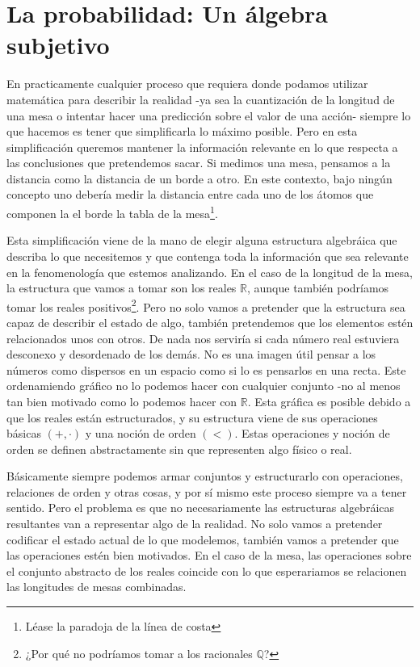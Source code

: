 
\chapter{La probabilidad: Un \'algebra subjetivo}
En practicamente cualquier proceso que requiera donde podamos utilizar matemática para describir la realidad -ya sea la cuantización de la longitud de una mesa o intentar hacer una predicción sobre el valor de una acción- siempre lo que hacemos es tener que simplificarla lo máximo posible. Pero en esta simplificación queremos mantener la información relevante en lo que respecta a las conclusiones que pretendemos sacar. Si medimos una mesa, pensamos a la distancia como la distancia de un borde a otro. En este contexto, bajo ningún concepto uno debería medir la distancia entre cada uno de los átomos que componen la el borde la tabla de la mesa\footnote{Léase la paradoja de la línea de costa}. 

Esta simplificación viene de la mano de elegir alguna estructura algebráica que describa lo que necesitemos y que contenga toda la información que sea relevante en la fenomenología que estemos analizando. En el caso de la longitud de la mesa, la estructura que vamos a tomar son los reales $\mathbb{R}$, aunque también podríamos tomar los reales positivos\footnote{¿Por qué no podríamos tomar a los racionales $\mathbb{Q}$?}. Pero no solo vamos a pretender que la estructura sea capaz de describir el estado de algo, también pretendemos que los elementos estén relacionados unos con otros. De nada nos serviría si cada número real estuviera desconexo y desordenado de los demás. No es una imagen útil pensar a los números como dispersos en un espacio como si lo es pensarlos en una recta. Este ordenamiendo gráfico no lo podemos hacer con cualquier conjunto -no al menos tan bien motivado como lo podemos hacer con $\mathbb{R}$. Esta gráfica es posible debido a que los reales están estructurados, y su estructura viene de sus operaciones básicas $(+, \cdot)$ y una noción de orden $(<)$. Estas operaciones y noción de orden se definen abstractamente sin que representen algo físico o real. 

Básicamente siempre podemos armar conjuntos y estructurarlo con operaciones, relaciones de orden y otras cosas, y por sí mismo este proceso siempre va a tener sentido. Pero el problema es que no necesariamente las estructuras algebráicas resultantes van a representar algo de la realidad. No solo vamos a pretender codificar el estado actual de lo que modelemos, también vamos a pretender que las operaciones estén bien motivados. En el caso de la mesa, las operaciones sobre el conjunto abstracto de los reales coincide con lo que esperariamos se relacionen las longitudes de mesas combinadas.

